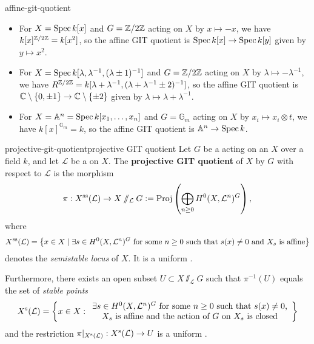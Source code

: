 \begin{example}{affine-git-quotient}
    \begin{itemize}
        \item For $X = \operatorname{Spec} k[x]$ and $G = \mathbb{Z}/2\mathbb{Z}$ acting on $X$ by $x \mapsto -x$, we have $k[x]^{\mathbb{Z}/2\mathbb{Z}} = k[x^2]$, so the affine GIT quotient is $\operatorname{Spec} k[x] \to \operatorname{Spec} k[y]$ given by $y \mapsto x^2$.
        \item For $X = \operatorname{Spec} k[\lambda, \lambda^{-1}, (\lambda \pm 1)^{-1}]$ and $G = \mathbb{Z}/2\mathbb{Z}$ acting on $X$ by $\lambda \mapsto -\lambda^{-1}$, we have $R^{\mathbb{Z}/2\mathbb{Z}} = k[\lambda + \lambda^{-1}, (\lambda + \lambda^{-1} \pm 2)^{-1}]$, so the affine GIT quotient is $\mathbb{C} \setminus \{ 0, \pm 1 \} \to \mathbb{C} \setminus \{ \pm 2 \}$ given by $\lambda \mapsto \lambda + \lambda^{-1}$.
        \item For $X = \mathbb{A}^n = \operatorname{Spec} k[x_1, \ldots, x_n]$ and $G = \mathbb{G}_m$ acting on $X$ by $x_i \mapsto x_i \otimes t$, we have $k[x]^{\mathbb{G}_m} = k$, so the affine GIT quotient is $\mathbb{A}^n \to \operatorname{Spec} k$.
    \end{itemize}
\end{example}

\begin{topic}{projective-git-quotient}{projective GIT quotient}
    Let $G$ be a   acting on an  $X$ over a field $k$, and let $\mathcal{L}$ be a   on $X$. The \textbf{projective GIT quotient} of $X$ by $G$ with respect to $\mathcal{L}$ is the morphism
    \[ \pi : X^\textup{ss}(\mathcal{L}) \to X \sslash_\mathcal{L} G := \text{Proj}\left(\bigoplus_{n \ge 0} H^0(X, \mathcal{L}^n)^G \right) , \]
    where
    \[ X^\textup{ss}(\mathcal{L}) = \left\{ x \in X \mid \exists s \in H^0(X, \mathcal{L}^n)^G \text{ for some $n \ge 0$ such that $s(x) \ne 0$ and $X_s$ is affine} \right\} \]
    denotes the \textit{semistable locus} of $X$. It is a uniform .
    
    Furthermore, there exists an open subset $U \subset X \sslash_\mathcal{L} G$ such that $\pi^{-1}(U)$ equals the set of \textit{stable points} \[ X^\textup{s}(\mathcal{L}) = \left\{ x \in X : \begin{array}{c} \exists s \in H^0(X, \mathcal{L}^n)^G \text{ for some $n \ge 0$ such that $s(x) \ne 0$,} \\ \text{$X_s$ is affine and the action of $G$ on $X_s$ is closed} \end{array} \right\} \]
    and the restriction $\pi|_{X^\textup{s}(\mathcal{L})} : X^\textup{s}(\mathcal{L}) \to U$ is a uniform .
\end{topic}

